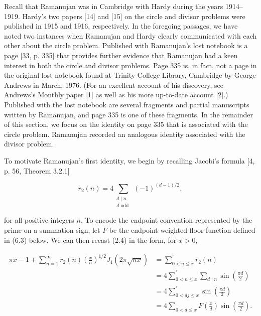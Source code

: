 \documentclass[10pt]{article}
\theoremstyle{plain}
\begin{document}
Recall that Ramanujan was in Cambridge with Hardy during the years 1914--1919. Hardy's two papers [14] and [15] on the circle and divisor problems were published in 1915 and 1916, respectively. In the foregoing passages, we have noted two instances when Ramanujan and Hardy clearly communicated with each other about the circle problem. Published with Ramanujan's lost notebook is a page [33, p. 335] that provides further evidence that Ramanujan had a keen interest in both the circle and divisor problems. Page 335 is, in fact, not a page in the original lost notebook found at Trinity College Library, Cambridge by George Andrews in March, 1976. (For an excellent account of his discovery, see Andrews's Monthly paper [1] as well as his more up-to-date account [2].) Published with the lost notebook are several fragments and partial manuscripts written by Ramanujan, and page 335 is one of these fragments. In the remainder of this section, we focus on the identity on page 335 that is associated with the circle problem. Ramanujan recorded an analogous identity associated with the divisor problem.

To motivate Ramanujan's first identity, we begin by recalling Jacobi's formula [4, p. 56, Theorem 3.2.1]


\begin{equation*}
r_{2}(n)=4 \sum_{\substack{d \mid n \\ d \text { odd }}}(-1)^{(d-1) / 2}, \tag{6.1}
\end{equation*}


for all positive integers $n$. To encode the endpoint convention represented by the prime on a summation sign, let $F$ be the endpoint-weighted floor function defined in (6.3) below. We can then recast (2.4) in the form, for $x>0$,


\begin{align*}
\pi x-1+\sum_{n=1}^{\infty} r_{2}(n)\left(\frac{x}{n}\right)^{1 / 2} J_{1}(2 \pi \sqrt{n x}) & =\sum_{0<n \leq x}^{\prime} r_{2}(n) \\
& =4 \sum_{0<n \leq x}^{\prime} \sum_{d \mid n} \sin \left(\frac{\pi d}{2}\right) \\
& =4 \sum_{0<d j \leq x}^{\prime} \sin \left(\frac{\pi d}{2}\right) \\
& =4 \sum_{0<d \leq x}F\left(\frac{x}{d}\right) \sin \left(\frac{\pi d}{2}\right). \tag{6.2}
\end{align*}
\end{document}
